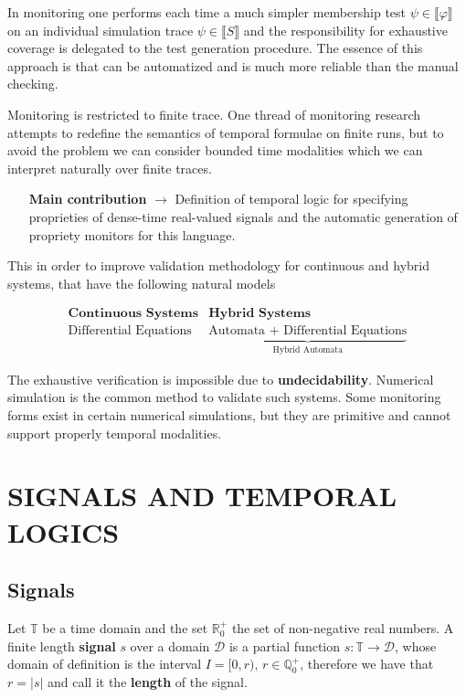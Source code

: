\documentclass{suftesi}
\renewcommand{\b}{\textbf}
\newcommand{\abs}[1]{\lvert #1 \rvert}
\newcommand{\sem}[1]{\llbracket #1 \rrbracket}
\begin{document}
In monitoring one performs each time a much simpler membership test $\psi \in \sem{\varphi}$ on an individual simulation trace $\psi\in\sem{S}$ and the responsibility for exhaustive coverage is delegated to the test generation procedure. The essence of this approach is that can be automatized and is much more reliable than the manual checking.

Monitoring is restricted to finite trace. One thread of  monitoring research attempts to redefine the semantics of temporal formulae on finite runs, but to avoid the problem we can consider bounded time modalities which we can interpret naturally over finite traces.

\begin{itemize}[leftmargin=3.45cm]
    \item [\b{Main contribution} $\rightarrow$] Definition of temporal logic for specifying proprieties of dense-time real-valued signals and the automatic generation of propriety monitors for this language. 
\end{itemize}

This in order to improve validation methodology for continuous and hybrid systems, that have the following natural models

\[
\begin{array}{cc} 
    \textbf{Continuous Systems} & \textbf{Hybrid Systems} \\
    \text{Differential Equations} & 
    \underbrace{\text{Automata + Differential Equations}}_{\text{Hybrid Automata}}
\end{array}
\]

The exhaustive verification is impossible due to \b{undecidability}. Numerical simulation is the common method to validate such systems. Some monitoring forms exist in certain numerical simulations, but they are primitive and cannot support properly temporal modalities. 

\section{SIGNALS AND TEMPORAL LOGICS}

\subsection{Signals}

Let $\mathbb{T}$ be a time domain and the set $\mathbb{R}^+_0$ the set of non-negative real numbers. A finite length \b{signal} $s$ over a domain $\mathcal{D}$ is a partial function $s:\mathbb{T}\to\mathcal{D}$, whose domain of definition is the interval $I=[0,r),\, r\in\mathbb{Q}^+_0$, therefore we have that $r=\abs{s}$ and call it the \b{length} of the signal.
\end{document}
